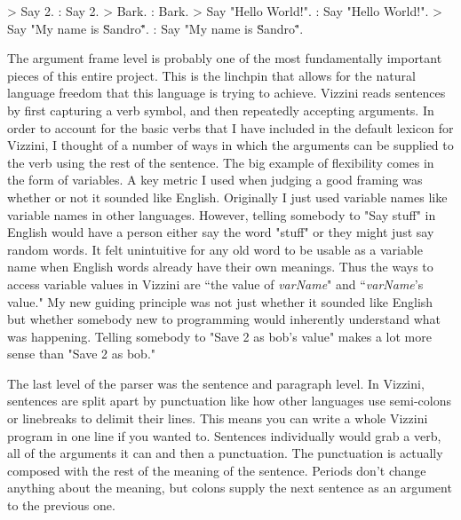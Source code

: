 \documentclass[titlepage]{article}
\newcommand{\langName}{Vizzini}
\begin{document}
\begin{codeblock}[caption={Lexer and Literal Parsing},label={lst:literalExample}]
> Say 2.
: {Say}{ }{2}{.}
> Bark.
: {Bark}{.}
> Say "Hello World!".
: {Say}{ }{"Hello World!"}{.}
> Say "My name is \"Sandro\"".
: {Say}{ }{"My name is \"Sandro\""}{.}
\end{codeblock}

The argument frame level is probably one of the most fundamentally important pieces of this entire project. This is the linchpin that allows for the natural language freedom that this language is trying to achieve. \langName{} reads sentences by first capturing a verb symbol, and then repeatedly accepting arguments. In order to account for the basic verbs that I have included in the default lexicon for \langName{}, I thought of a number of ways in which the arguments can be supplied to the verb using the rest of the sentence. The big example of flexibility comes in the form of variables. A key metric I used when judging a good framing was whether or not it sounded like English. Originally I just used variable names like variable names in other languages. However, telling somebody to "Say stuff" in English would have a person either say the word "stuff" or they might just say random words. It felt unintuitive for any old word to be usable as a variable name when English words already have their own meanings. Thus the ways to access variable values in \langName{} are ``the value of \textlangle\textit{varName}\textrangle" and ``\textlangle\textit{varName}\textrangle's value." My new guiding principle was not just whether it sounded like English but whether somebody new to programming would inherently understand what was happening. Telling somebody to "Save 2 as bob's value" makes a lot more sense than "Save 2 as bob."

The last level of the parser was the sentence and paragraph level. In \langName{}, sentences are split apart by punctuation like how other languages use semi-colons or linebreaks to delimit their lines. This means you can write a whole \langName{} program in one line if you wanted to. Sentences individually would grab a verb, all of the arguments it can and then a punctuation. The punctuation is actually composed with the rest of the meaning of the sentence. Periods don't change anything about the meaning, but colons supply the next sentence as an argument to the previous one.
\end{document}
